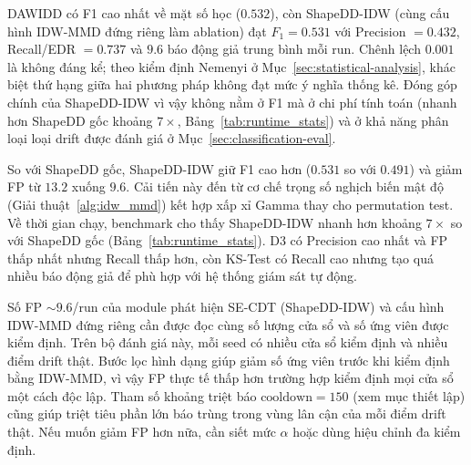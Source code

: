 \begin{table}[H]
	\centering
	\caption[So sánh tổng hợp hiệu suất các phương pháp phát hiện drift]{So sánh tổng hợp hiệu suất các phương pháp phát hiện drift. \textit{Lưu ý:} ShapeDD-IDW là module phát hiện của SE-CDT; SE-CDT là toàn bộ hệ thống (bao gồm cả module phân loại). Ở benchmark phát hiện này, hai dòng dùng cùng thuật toán nên F1, Precision, Recall, FP trùng nhau theo thiết kế.}
	\label{tab:comprehensive_performance}
	
\end{table}

DAWIDD có F1 cao nhất về mặt số học ($0.532$), còn ShapeDD-IDW (cùng cấu hình IDW-MMD đứng riêng làm ablation) đạt $F_1 = 0.531$ với Precision $=0.432$, Recall/EDR $=0.737$ và $9.6$ báo động giả trung bình mỗi run. Chênh lệch $0.001$ là không đáng kể; theo kiểm định Nemenyi ở Mục~\ref{sec:statistical-analysis}, khác biệt thứ hạng giữa hai phương pháp không đạt mức ý nghĩa thống kê. Đóng góp chính của ShapeDD-IDW vì vậy không nằm ở F1 mà ở chi phí tính toán (nhanh hơn ShapeDD gốc khoảng $7\times$, Bảng~\ref{tab:runtime_stats}) và ở khả năng phân loại loại drift được đánh giá ở Mục~\ref{sec:classification-eval}.

So với ShapeDD gốc, ShapeDD-IDW giữ F1 cao hơn ($0.531$ so với $0.491$) và giảm FP từ $13.2$ xuống $9.6$. Cải tiến này đến từ cơ chế trọng số nghịch biến mật độ (Giải thuật~\ref{alg:idw_mmd}) kết hợp xấp xỉ Gamma thay cho permutation test. Về thời gian chạy, benchmark cho thấy ShapeDD-IDW nhanh hơn khoảng $7\times$ so với ShapeDD gốc (Bảng~\ref{tab:runtime_stats}). D3 có Precision cao nhất và FP thấp nhất nhưng Recall thấp hơn, còn KS-Test có Recall cao nhưng tạo quá nhiều báo động giả để phù hợp với hệ thống giám sát tự động.

Số FP $\sim 9.6$/run của module phát hiện SE-CDT (ShapeDD-IDW) và cấu hình IDW-MMD đứng riêng cần được đọc cùng số lượng cửa sổ và số ứng viên được kiểm định. Trên bộ đánh giá này, mỗi seed có nhiều cửa sổ kiểm định và nhiều điểm drift thật. Bước lọc hình dạng giúp giảm số ứng viên trước khi kiểm định bằng IDW-MMD, vì vậy FP thực tế thấp hơn trường hợp kiểm định mọi cửa sổ một cách độc lập. Tham số khoảng triệt báo $\text{cooldown}=150$ (xem mục thiết lập) cũng giúp triệt tiêu phần lớn báo trùng trong vùng lân cận của mỗi điểm drift thật. Nếu muốn giảm FP hơn nữa, cần siết mức $\alpha$ hoặc dùng hiệu chỉnh đa kiểm định.

